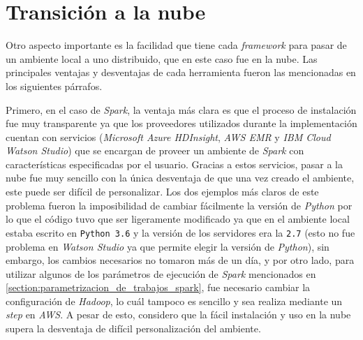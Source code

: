 \section{Transición a la nube}

Otro aspecto importante es la facilidad que tiene cada \textit{framework} para pasar de un ambiente local a uno distribuido, que en este caso fue en la nube. Las principales ventajas y desventajas de cada herramienta fueron las mencionadas en los siguientes párrafos.

Primero, en el caso de \textit{Spark}, la ventaja más clara es que el proceso de instalación fue muy transparente ya que los proveedores utilizados durante la implementación cuentan con servicios (\textit{Microsoft Azure HDInsight}, \textit{AWS EMR} y \textit{IBM Cloud Watson Studio}) que se encargan de proveer un ambiente de \textit{Spark} con características especificadas por el usuario. Gracias a estos servicios, pasar a la nube fue muy sencillo con la única desventaja de que una vez creado el ambiente, este puede ser difícil de personalizar. Los dos ejemplos más claros de este problema fueron la imposibilidad de cambiar fácilmente la versión de \textit{Python} por lo que el código tuvo que ser ligeramente modificado ya que en el ambiente local estaba escrito en \texttt{Python 3.6} y la versión de los servidores era la \texttt{2.7} (esto no fue problema en \textit{Watson Studio} ya que permite elegir la versión de \textit{Python}), sin embargo, los cambios necesarios no tomaron más de un día, y por otro lado, para utilizar algunos de los parámetros de ejecución de \textit{Spark} mencionados en \ref{section:parametrizacion_de_trabajos_spark}, fue necesario cambiar la configuración de \textit{Hadoop}, lo cuál tampoco es sencillo y sea realiza mediante un \textit{step} en \textit{AWS}. A pesar de esto, considero que la fácil instalación y uso en la nube supera la desventaja de difícil personalización del ambiente.

